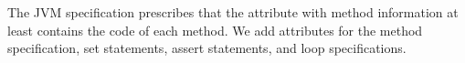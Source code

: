 

The JVM specification prescribes that the attribute with method
information at least contains the code of each method. We add
attributes for the method specification, set statements,
assert statements, and loop specifications.  


